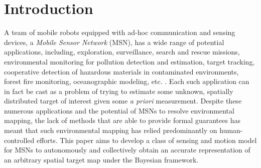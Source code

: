 \documentclass[letterpaper, 10 pt, conference]{ieeeconf}
\begin{document}
%




%
\IEEEpeerreviewmaketitle


\section{Introduction}
\label{sec:sec1}
A team of mobile robots equipped with ad-hoc communication and sensing devices, a \emph{Mobile Sensor Network} (MSN), has a wide range of potential applications, including, exploration, surveillance, search and rescue missions, environmental monitoring for pollution detection and estimation, target tracking, cooperative detection of hazardous materials in contaminated environments, forest fire monitoring, oceanographic modeling, etc. \cite{dhillon2003sensor,howard2002mobile,cortes_coverage_2004,yu2005real}. 
Each such application can in fact be cast as a problem of trying to estimate some unknown, spatially distributed target of interest given some \textit{a priori} measurement. 
Despite these numerous applications and the potential of MSNs to resolve environmental mapping, the lack of methods that are able to provide formal guarantees has meant that such environmental mapping has relied predominantly on human-controlled efforts. 
This paper aims to develop a class of sensing and motion model for MSNs to autonomously and collectively obtain an accurate representation of an arbitrary spatial target map under the Bayesian framework.
\end{document}
